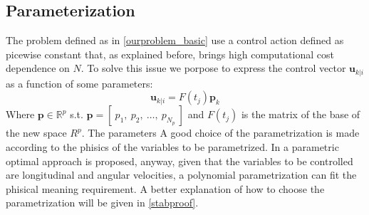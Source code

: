 \subsection{Parameterization}

The problem defined as in \ref{ourproblem_basic} use a control action defined as picewise constant that, as explained before, brings high computational cost dependence on $N$. To solve this issue we porpose to express the control vector $\textbf{u}_{k|i}$ as a function of some parameters:
\begin{equation}\label{param_eq}
\textbf{u}_{k|i}=F(t_j)\textbf{p}_k
\end{equation}
Where $\textbf{p} \in \mathbb{R}^p$ s.t. $\textbf{p}=[\ p_1,\ p_2,\ \dots,\ p_{N_p}\ ]$ and $F(t_j)$ is the matrix of the base of the new space $R^p$. The parameters  A good choice of the parametrization is made according to the phisics of the variables to be parametrized. In \cite{kelly2013mobile} a parametric optimal approach is proposed, anyway, given that the variables to be controlled are longitudinal and angular velocities, a polynomial parametrization can fit the phisical meaning requirement. A better explanation of how to choose the parametrization will be given in \ref{stabproof}.

